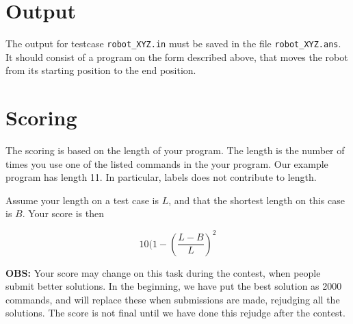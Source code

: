 \section*{Output}
The output for testcase \texttt{robot\_XYZ.in} must be saved in the file \texttt{robot\_XYZ.ans}. It should consist of a program on the form described above, that moves the robot from its starting position to the end position.

\section*{Scoring}
The scoring is based on the length of your program. The length is the number of times you use one of the listed commands in the your program. Our example program has length 11. In particular, labels does not contribute to length.

Assume your length on a test case is $L$, and that the shortest length on this case is $B$. Your score is then

\[ 10 (1 - (\frac{L - B}{L})^2\]

\textbf{OBS:} Your score may change on this task during the contest, when people submit better solutions. In the beginning, we have put the best solution as 2000 commands, and will replace these when submissions are made, rejudging all the solutions. The score is not final until we have done this rejudge after the contest.
